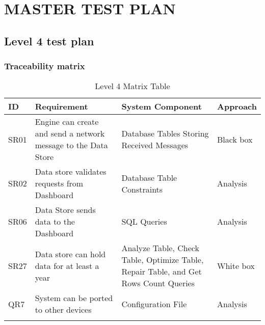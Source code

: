 \documentclass[letterpaper,12pt,oneside,listof=totoc]{scrreprt}
\begin{document}




\chapter{MASTER TEST PLAN}

\section{Level 4 test plan}


\subsection{Traceability matrix}
\begin{longtable}{ p{} |  p{} | p{}  | p{}}
\hline
\textbf{ID} & \textbf{Requirement} & \textbf{System Component} & \textbf{Approach} \\
\hline
SR01 & Engine can create and send a network message to the Data Store & Database Tables Storing Received Messages&Black box\\
\hline
SR02 & Data store validates requests from Dashboard & Database Table Constraints&Analysis\\
\hline
SR06 & Data Store sends data to the Dashboard & SQL Queries&Analysis\\
\hline
SR27 & Data store can hold data for at least a year & Analyze Table, Check Table, Optimize Table, Repair Table, and Get Rows Count Queries&White box\\
\hline
QR7 & System can be ported to other devices & Configuration File&Analysis\\
\hline
\caption{Level 4 Matrix Table}
\label{Level 4 Matrix Table}
\end{longtable}

\end{document}
